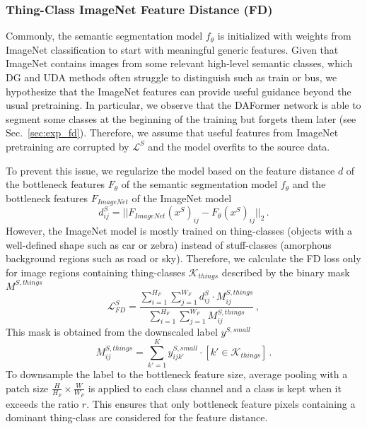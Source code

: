 \documentclass[journal,compsoc]{IEEEtran}
\begin{document}
\subsubsection{Thing-Class ImageNet Feature Distance (FD)}
\label{sec:methods_feature_distance}
Commonly, the semantic segmentation model $f_\theta$ is initialized with weights from ImageNet classification to start with meaningful generic features. Given that ImageNet contains images from some relevant high-level semantic classes, which DG and UDA methods often struggle to distinguish such as train or bus, we hypothesize that the ImageNet features can provide useful guidance beyond the usual pretraining. In particular, we observe that the DAFormer network is able to segment some classes at the beginning of the training but forgets them later (see Sec.~\ref{sec:exp_fd}).
Therefore, we assume that useful features from ImageNet pretraining are corrupted by $\mathcal{L}^S$ and the model overfits to the source data.

To prevent this issue, we regularize the model based on the feature distance $d$ of the bottleneck features $F_\theta$ of the semantic segmentation model $f_\theta$ and the bottleneck features $F_\mathit{ImageNet}$ of the ImageNet model
\begin{equation}
    d^S_{ij} = ||F_{ImageNet}(x^S)_{ij} - F_\theta(x^S)_{ij}||_2\,.
\end{equation}
However, the ImageNet model is mostly trained on thing-classes (objects with a well-defined shape such as car or zebra) instead of stuff-classes (amorphous background regions such as road or sky). Therefore, we calculate the FD loss only for image regions containing thing-classes $\mathcal{K}_\mathit{things}$ described by the binary mask $M^\mathit{S,things}$
\begin{equation}
    \mathcal{L}^S_\mathit{FD} = \frac{\sum_{i=1}^{H_F} \sum_{j=1}^{W_F} d^S_{ij} \cdot M^\mathit{S,things}_{ij}}{\sum_{i=1}^{H_F} \sum_{j=1}^{W_F} M^\mathit{S,things}_{ij}}\,,
\end{equation}
This mask is obtained from the downscaled label $y^{S, \mathit{small}}$
\begin{equation}
    M^\mathit{S,things}_{ij} = \sum_{k'=1}^K y^{S,\mathit{small}}_{ijk'} \cdot [k' \in \mathcal{K}_\mathit{things}]\,.
\end{equation}
To downsample the label to the bottleneck feature size, average pooling with a patch size $\frac{H}{H_F} {\times} \frac{W}{W_F}$ is applied to each class channel and a class is kept when it exceeds the ratio $r$.
This ensures that only bottleneck feature pixels containing a dominant thing-class are considered for the feature distance.
\end{document}
